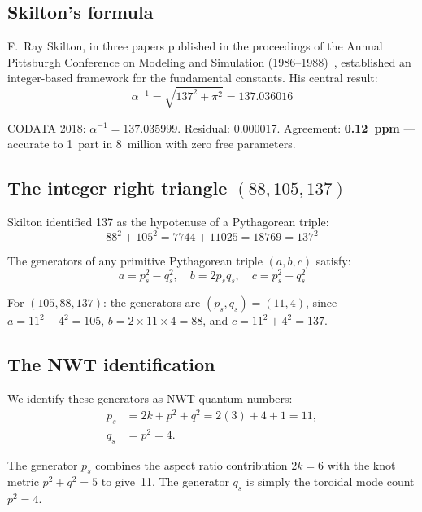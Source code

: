\documentclass[11pt,a4paper]{article}
\begin{document}
\subsection{Skilton's formula}

F.~Ray Skilton, in three papers published in the proceedings of the Annual Pittsburgh Conference on Modeling and Simulation (1986--1988)~\cite{skilton1986,skilton1987,skilton1988}, established an integer-based framework for the fundamental constants. His central result:
\begin{equation}
  \alpha^{-1} = \sqrt{137^2 + \pi^2} = 137.036016
  \label{eq:skilton}
\end{equation}

CODATA 2018: $\alpha^{-1} = 137.035999$. Residual: 0.000017. Agreement: \textbf{0.12~ppm} --- accurate to 1~part in 8~million with zero free parameters.

\subsection{The integer right triangle $(88, 105, 137)$}

Skilton identified 137 as the hypotenuse of a Pythagorean triple:
\begin{equation}
  88^2 + 105^2 = 7744 + 11025 = 18769 = 137^2
\end{equation}

The generators of any primitive Pythagorean triple $(a, b, c)$ satisfy:
\begin{equation}
  a = p_s^2 - q_s^2, \quad b = 2p_s q_s, \quad c = p_s^2 + q_s^2
\end{equation}

For $(105, 88, 137)$: the generators are $(p_s, q_s) = (11, 4)$, since $a = 11^2 - 4^2 = 105$, $b = 2 \times 11 \times 4 = 88$, and $c = 11^2 + 4^2 = 137$.

\subsection{The NWT identification}

We identify these generators as NWT quantum numbers:
\begin{align}
  p_s &= 2k + p^2 + q^2 = 2(3) + 4 + 1 = 11, \label{eq:ps} \\
  q_s &= p^2 = 4. \label{eq:qs}
\end{align}

The generator $p_s$ combines the aspect ratio contribution $2k = 6$ with the knot metric $p^2 + q^2 = 5$ to give~11. The generator $q_s$ is simply the toroidal mode count $p^2 = 4$.
\end{document}
